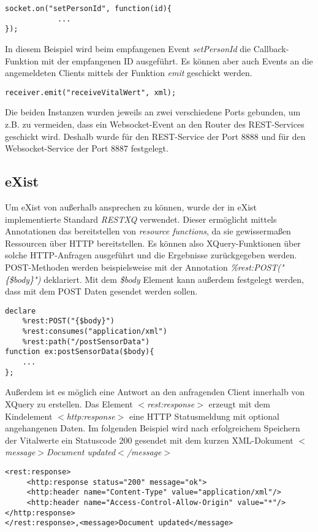 \begin{lstlisting}
socket.on("setPersonId", function(id){
            ...
});
\end{lstlisting}

In diesem Beispiel wird beim empfangenen Event \textit{setPersonId} die Callback-Funktion mit der empfangenen ID ausgeführt. Es können aber auch Events an die angemeldeten Clients mittels der Funktion \textit{emit} geschickt werden.

\begin{lstlisting}
receiver.emit("receiveVitalWert", xml);
\end{lstlisting}

Die beiden Instanzen wurden jeweils an zwei verschiedene Ports gebunden, um z.B. zu vermeiden, dass ein Websocket-Event an den Router des REST-Services geschickt wird. Deshalb wurde für den REST-Service der Port 8888 und für den Websocket-Service der Port 8887 festgelegt.

\subsection{eXist}
Um eXist von außerhalb ansprechen zu können, wurde der in eXist implementierte Standard \textit{RESTXQ} verwendet. Dieser ermöglicht mittels Annotationen das bereitstellen von \textit{resource functions}, da sie gewissermaßen Ressourcen über HTTP bereitstellen. Es können also XQuery-Funktionen über solche HTTP-Anfragen ausgeführt und die Ergebnisse zurückgegeben werden. POST-Methoden werden beispielsweise mit der Annotation \textit{\%rest:POST("\{\$body\}")} deklariert. Mit dem \textit{\$body} Element kann außerdem festgelegt werden, dass mit dem POST Daten gesendet werden sollen.

\begin{lstlisting}
declare
    %rest:POST("{$body}")
    %rest:consumes("application/xml")
    %rest:path("/postSensorData")
function ex:postSensorData($body){
    ...
};
\end{lstlisting}

Außerdem ist es möglich eine Antwort an den anfragenden Client innerhalb von XQuery zu erstellen. Das Element \textit{$<$rest:response$>$} erzeugt mit dem Kindelement \textit{$<$http:response$>$} eine HTTP Statusmeldung mit optional angehangenen Daten. Im folgenden Beispiel wird nach erfolgreichem Speichern der Vitalwerte ein Statuscode 200 gesendet mit dem kurzen XML-Dokument \textit{$<$message$>$Document updated$<$/message$>$}

\begin{lstlisting}
<rest:response>
     <http:response status="200" message="ok">
     <http:header name="Content-Type" value="application/xml"/>
     <http:header name="Access-Control-Allow-Origin" value="*"/>
</http:response>
</rest:response>,<message>Document updated</message>
\end{lstlisting}


